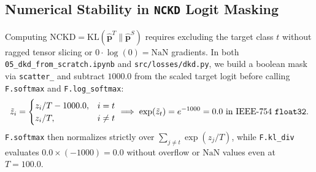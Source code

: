 \documentclass[11pt]{article}
\begin{document}
\begin{table}[H]
\centering
\small
\caption{Stage-by-stage batch tensor shapes (\(B = 64\)) for Teacher (\(n=5\)) and Student (\(n=1\)).}
\label{tab:stages}
\end{table}

\subsection{Numerical Stability in \texttt{NCKD} Logit Masking}

Computing \(\mathrm{NCKD} = \mathrm{KL}(\hat{\mathbf{p}}^T \parallel \hat{\mathbf{p}}^S)\) requires excluding the target class \(t\) without ragged tensor slicing or \(0 \cdot \log(0) = \mathrm{NaN}\) gradients. In both \texttt{05\_dkd\_from\_scratch.ipynb} and \texttt{src/losses/dkd.py}, we build a boolean mask via \texttt{scatter\_} and subtract \(1000.0\) from the scaled target logit before calling \texttt{F.softmax} and \texttt{F.log\_softmax}:
\[
\tilde{z}_i = \begin{cases} z_i / T - 1000.0, & i = t \\ z_i / T, & i \neq t \end{cases} \implies \exp(\tilde{z}_t) = e^{-1000} = 0.0 \text{ in IEEE-754 \texttt{float32}}.
\]
\texttt{F.softmax} then normalizes strictly over \(\sum_{j \neq t} \exp(z_j / T)\), while \texttt{F.kl\_div} evaluates \(0.0 \times (-1000) = 0.0\) without overflow or \(\mathrm{NaN}\) values even at \(T = 100.0\).
\end{document}
